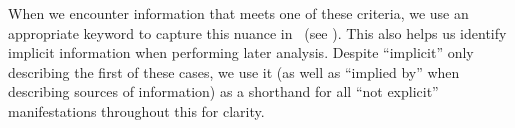 
When we encounter information that meets one of these criteria, we use an
appropriate keyword to capture this nuance in \ourApproachGlossary{}\ifnotpaper\
    (see )\fi. This also helps us identify implicit
information when performing later analysis. Despite ``implicit'' only
describing the first of these cases, we use it (as well as ``implied by'' when
describing sources of information) as a shorthand for all ``not explicit''
manifestations throughout this \docType{} for clarity.

\ifnotpaper
    

